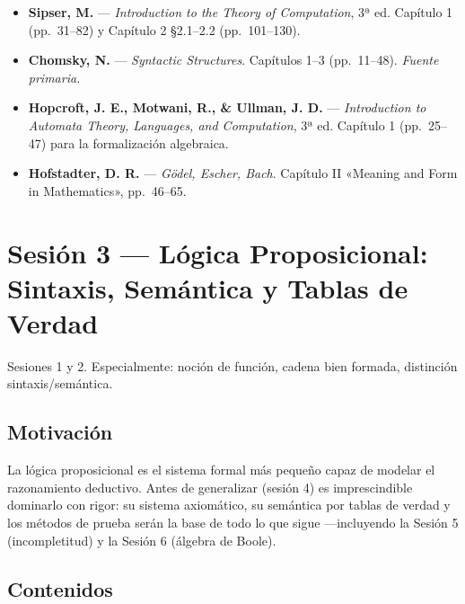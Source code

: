 \documentclass[11pt, letterpaper]{article}
\begin{document}
\begin{lecturas}
\begin{itemize}
  \item[$(\star)$] \textbf{Sipser, M.} — \emph{Introduction to the Theory of Computation}, 3ª ed. Capítulo 1 (pp.\ 31--82) y Capítulo 2 §2.1--2.2 (pp.\ 101--130).
  \item[$(\star)$] \textbf{Chomsky, N.} — \emph{Syntactic Structures}. Capítulos 1--3 (pp.\ 11--48). \textit{Fuente primaria.}
  \item \textbf{Hopcroft, J. E., Motwani, R., \& Ullman, J. D.} — \emph{Introduction to Automata Theory, Languages, and Computation}, 3ª ed. Capítulo 1 (pp.\ 25--47) para la formalización algebraica.
  \item \textbf{Hofstadter, D. R.} — \emph{Gödel, Escher, Bach}. Capítulo II «Meaning and Form in Mathematics», pp.\ 46--65.
\end{itemize}
\end{lecturas}

\newpage

\section{Sesión 3 — Lógica Proposicional: Sintaxis, Semántica y Tablas de Verdad}

\begin{prereqs}
Sesiones 1 y 2. Especialmente: noción de función, cadena bien formada, distinción sintaxis/semántica.
\end{prereqs}

\subsection*{Motivación}
La lógica proposicional es el sistema formal más pequeño capaz de modelar el razonamiento deductivo. Antes de generalizar (sesión 4) es imprescindible dominarlo con rigor: su sistema axiomático, su semántica por tablas de verdad y los métodos de prueba serán la base de todo lo que sigue —incluyendo la Sesión 5 (incompletitud) y la Sesión 6 (álgebra de Boole).

\subsection{Contenidos}
\end{document}
